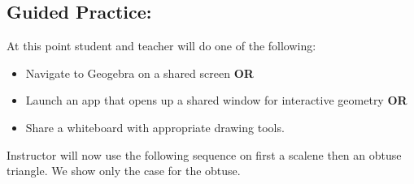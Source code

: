 \documentclass{tufte-handout}
\newcommand{\uv}{\vspace{.1in}}
\begin{document}
\begin{tcolorbox}[enhanced jigsaw,breakable,pad at break*=1mm,attach boxed title to top center={yshift=-3mm,yshifttext=-1mm},
  colback=yellow!50!white,colframe=yellow,colbacktitle=red!80!black,
  title=Lesson Design Specifications (Please Read),fonttitle=\bfseries,
  boxed title style={size=small,colframe=red!50!black} ]
  \section{Guided Practice: }
 At this point student and teacher will do one of the following: 
    \begin{itemize}
      \item Navigate to Geogebra on a shared screen \textbf{OR}
      \item Launch an app that opens up a shared window for interactive geometry \textbf{OR}
      \item Share a whiteboard with appropriate drawing tools.
  \end{itemize}
Instructor will now use the following sequence on first a scalene then an obtuse triangle. We show only the case for the obtuse. 

 
 \uv
  \begin{minipage}{0.5\textwidth}
\end{minipage} \hfill
\begin{minipage}{0.45\textwidth}
\begin{scriptsize}


\end{scriptsize}
\end{minipage}
\end{tcolorbox}
\end{document}
